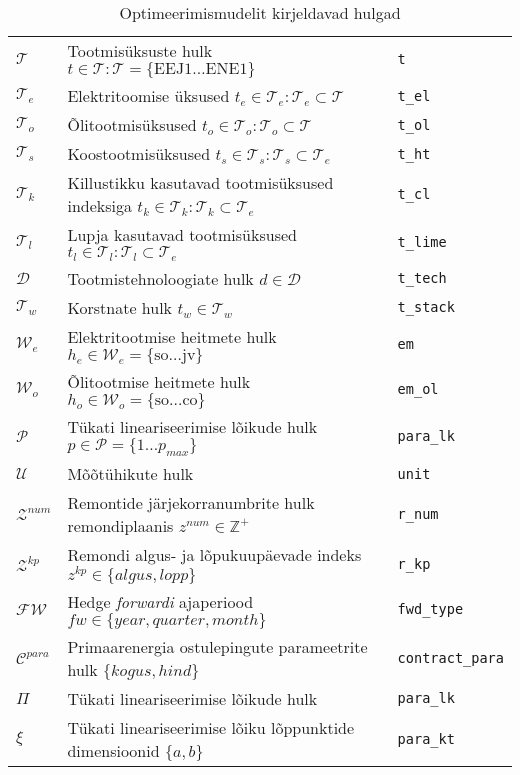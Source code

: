 \begin{table}
\begin{tabular}{l l l}
$\mathcal{T}$   & Tootmisüksuste hulk $t \in \mathcal{T}: \mathcal{T} = \{\mathrm{EEJ1}\dots \mathrm{ENE1}\}$ & \texttt{t}\\
$\mathcal{T}_e$ & Elektritoomise üksused $t_e \in \mathcal{T}_e: \mathcal{T}_e \subset \mathcal{T} $ & \texttt{t\_el} \\
$\mathcal{T}_o$ & Õlitootmisüksused $t_o \in \mathcal{T}_o: \mathcal{T}_o \subset \mathcal{T} $ & \texttt{t\_ol}\\
$\mathcal{T}_s$ & Koostootmisüksused $t_s \in \mathcal{T}_s: \mathcal{T}_s \subset \mathcal{T}_e $ & \texttt{t\_ht}\\
$\mathcal{T}_k$ & Killustikku kasutavad tootmisüksused indeksiga $t_k \in \mathcal{T}_k: \mathcal{T}_k \subset \mathcal{T}_e$ & \texttt{t\_cl} \\
$\mathcal{T}_l$ & Lupja kasutavad tootmisüksused $t_l \in \mathcal{T}_l: \mathcal{T}_l \subset \mathcal{T}_e $ & \texttt{t\_lime}\\
$\mathcal{D}$   & Tootmistehnoloogiate hulk $d \in \mathcal{D}$ & \texttt{t\_tech}\\
$\mathcal{T}_w$ & Korstnate hulk $t_w \in \mathcal{T}_w$ & \texttt{t\_stack}\\

$\mathcal{W}_e$ & Elektritootmise heitmete hulk $h_e \in \mathcal{W}_e = \{\mathrm{so}\dots \mathrm{jv}\}$ & \texttt{em}\\
$\mathcal{W}_o$ & Õlitootmise heitmete hulk $h_o \in \mathcal{W}_o = \{\mathrm{so}\dots \mathrm{co}\}$ & \texttt{em\_ol} \\
$\mathcal{P}$   & Tükati lineariseerimise lõikude hulk $p \in \mathcal{P} = \{1\dots p_{max}\}$ & \texttt{para\_lk} \\

$\mathcal{U}$   & Mõõtühikute hulk &\texttt{unit} \\
$\mathcal{Z}^{num}$ & Remontide järjekorranumbrite hulk remondiplaanis $z^{num} \in \mathbb{Z}^+$ & \texttt{r\_num} \\
$\mathcal{Z}^{kp}$  & Remondi algus- ja lõpukuupäevade indeks $z^{kp} \in \{algus, lopp\}$ & \texttt{r\_kp} \\ 
$\mathcal{FW}$ & Hedge \emph{forwardi} ajaperiood $fw \in \{year, quarter, month\}$ & \texttt{fwd\_type} \\
$\mathcal{C}^{para}$& Primaarenergia ostulepingute parameetrite hulk $\{kogus, hind\}$ & \texttt{contract\_para} \\
$\Pi$& Tükati lineariseerimise lõikude hulk & \texttt{para\_lk} \\
$\xi$& Tükati lineariseerimise lõiku lõppunktide dimensioonid $\{a,b\}$ & \texttt{para\_kt} \\
\end{tabular}
\caption{Optimeerimismudelit kirjeldavad hulgad \label{tab:hulgad}}
\end{table}